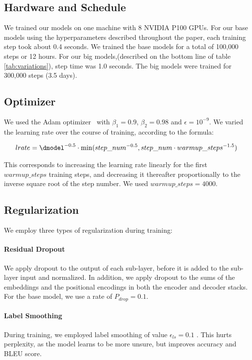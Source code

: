 \subsection{Hardware and Schedule}

We trained our models on one machine with 8 NVIDIA P100 GPUs.  For our base models using the hyperparameters described throughout the paper, each training step took about 0.4 seconds.  We trained the base models for a total of 100,000 steps or 12 hours.  For our big models,(described on the bottom line of table \ref{tab:variations}), step time was 1.0 seconds.  The big models were trained for 300,000 steps (3.5 days).

\subsection{Optimizer} We used the Adam optimizer~\citep{kingma2014adam} with $\beta_1=0.9$, $\beta_2=0.98$ and $\epsilon=10^{-9}$.  We varied the learning rate over the course of training, according to the formula:

\begin{equation}
lrate = \dmodel^{-0.5} \cdot
  \min({step\_num}^{-0.5},
    {step\_num} \cdot {warmup\_steps}^{-1.5})
\end{equation}

This corresponds to increasing the learning rate linearly for the first $warmup\_steps$ training steps, and decreasing it thereafter proportionally to the inverse square root of the step number.  We used $warmup\_steps=4000$.

\subsection{Regularization} \label{sec:reg}

We employ three types of regularization during training:
\paragraph{Residual Dropout} We apply dropout \citep{srivastava2014dropout} to the output of each sub-layer, before it is added to the sub-layer input and normalized.   In addition, we apply dropout to the sums of the embeddings and the positional encodings in both the encoder and decoder stacks.  For the base model, we use a rate of $P_{drop}=0.1$.

\paragraph{Label Smoothing} During training, we employed label smoothing of value $\epsilon_{ls}=0.1$ \citep{DBLP:journals/corr/SzegedyVISW15}.  This hurts perplexity, as the model learns to be more unsure, but improves accuracy and BLEU score.


